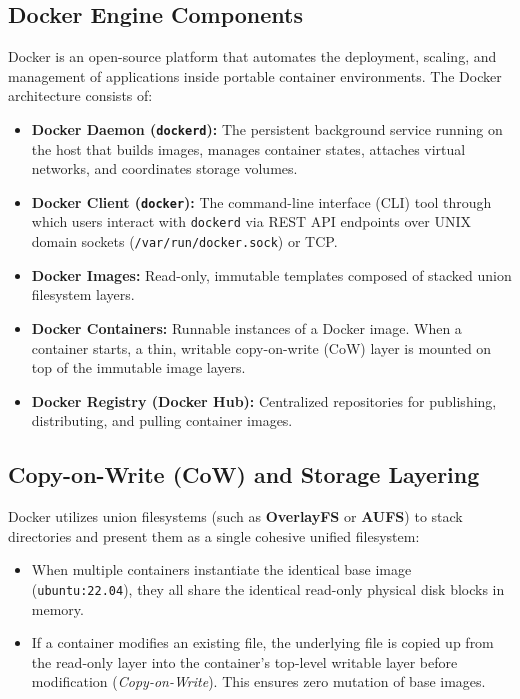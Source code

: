 \subsection{Docker Engine Components}
Docker is an open-source platform that automates the deployment, scaling, and management of applications inside portable container environments. The Docker architecture consists of:
\begin{itemize}[leftmargin=*]
  \item \textbf{Docker Daemon (\texttt{dockerd}):} The persistent background service running on the host that builds images, manages container states, attaches virtual networks, and coordinates storage volumes.
  \item \textbf{Docker Client (\texttt{docker}):} The command-line interface (CLI) tool through which users interact with \texttt{dockerd} via REST API endpoints over UNIX domain sockets (\texttt{/var/run/docker.sock}) or TCP.
  \item \textbf{Docker Images:} Read-only, immutable templates composed of stacked union filesystem layers.
  \item \textbf{Docker Containers:} Runnable instances of a Docker image. When a container starts, a thin, writable copy-on-write (CoW) layer is mounted on top of the immutable image layers.
  \item \textbf{Docker Registry (Docker Hub):} Centralized repositories for publishing, distributing, and pulling container images.
\end{itemize}

\subsection{Copy-on-Write (CoW) and Storage Layering}
Docker utilizes union filesystems (such as \textbf{OverlayFS} or \textbf{AUFS}) to stack directories and present them as a single cohesive unified filesystem:
\begin{itemize}[leftmargin=*]
  \item When multiple containers instantiate the identical base image (\texttt{ubuntu:22.04}), they all share the identical read-only physical disk blocks in memory.
  \item If a container modifies an existing file, the underlying file is copied up from the read-only layer into the container's top-level writable layer before modification (\emph{Copy-on-Write}). This ensures zero mutation of base images.
\end{itemize}

